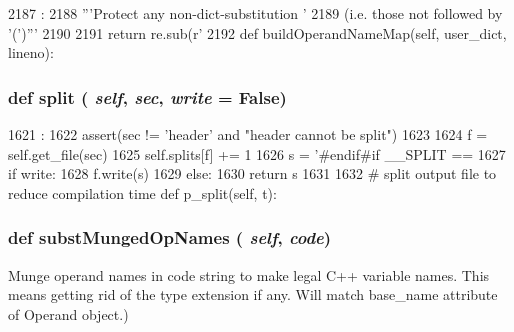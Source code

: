 \begin{DoxyCode}
2187                                         :
2188         '''Protect any non-dict-substitution '%
2189         (i.e. those not followed by '(')'''
2190 
2191         return re.sub(r'%
2192 
    def buildOperandNameMap(self, user_dict, lineno):
\end{DoxyCode}
\hypertarget{classisa__parser_1_1ISAParser_aa1b3eb766e0ce403f657d75fa4965fa3}{
\subsubsection[{split}]{\setlength{\rightskip}{0pt plus 5cm}def split ( {\em self}, \/   {\em sec}, \/   {\em write} = {\ttfamily False})}}
\label{classisa__parser_1_1ISAParser_aa1b3eb766e0ce403f657d75fa4965fa3}



\begin{DoxyCode}
1621                                      :
1622         assert(sec != 'header' and "header cannot be split")
1623 
1624         f = self.get_file(sec)
1625         self.splits[f] += 1
1626         s = '\n#endif\n#if __SPLIT == %
1627         if write:
1628             f.write(s)
1629         else:
1630             return s
1631 
1632     # split output file to reduce compilation time
    def p_split(self, t):
\end{DoxyCode}
\hypertarget{classisa__parser_1_1ISAParser_a64d2fc428be722d00820418561b2a57b}{
\subsubsection[{substMungedOpNames}]{\setlength{\rightskip}{0pt plus 5cm}def substMungedOpNames ( {\em self}, \/   {\em code})}}
\label{classisa__parser_1_1ISAParser_a64d2fc428be722d00820418561b2a57b}
\begin{DoxyVerb}Munge operand names in code string to make legal C++
variable names.  This means getting rid of the type extension
if any.  Will match base_name attribute of Operand object.)\end{DoxyVerb}
 


